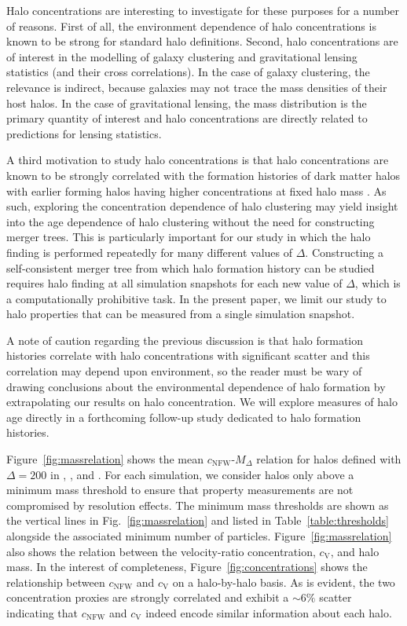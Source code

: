 \documentclass[usenatbib,fleqn]{mnras}
\begin{document}
Halo concentrations are interesting to investigate for these purposes for a number of reasons. First of all, the environment dependence of halo concentrations is known to be strong for standard halo definitions. Second, halo concentrations are of interest in the modelling of galaxy clustering and gravitational lensing statistics (and their cross correlations). In the case of galaxy clustering, the relevance is indirect, because galaxies may not trace the mass densities of their host halos. In the case of gravitational lensing, the mass distribution is the primary quantity of interest and halo concentrations are directly related to predictions for lensing statistics. 

A third motivation to study halo concentrations is that halo concentrations are known to be strongly correlated with the formation histories of dark matter halos with earlier forming halos having higher concentrations at fixed halo mass \citep{wechsler_etal02, zhao_etal03, wechsler_etal06, zhao_etal09}. 
As such, exploring the concentration dependence of halo clustering may yield insight into the age dependence of halo clustering without the need for constructing merger trees. This is particularly important for our study in which the halo finding is performed repeatedly for many different values of $\Delta$. Constructing a self-consistent merger tree from which halo formation history can be 
studied requires halo finding at all simulation snapshots for each new value of $\Delta$, which is a computationally prohibitive task. In the present paper, we limit our study to halo properties that can be measured from a single simulation 
snapshot. 

A note of caution regarding the previous discussion is that halo formation histories correlate with halo concentrations with significant scatter and this correlation may depend upon environment, so the reader must be wary of drawing conclusions about the environmental dependence of halo formation by extrapolating our results on halo concentration. We will explore measures of halo age directly in a forthcoming follow-up study dedicated to halo formation histories.

Figure~\ref{fig:massrelation} shows the mean $c_{\mathrm{NFW}}$-$M_{\Delta}$ relation for halos defined with $\Delta=200$ in \simA, \simB, and \simC. For each simulation, we consider halos only above a minimum mass threshold to ensure that property measurements are not compromised by resolution effects. The minimum mass thresholds are shown as the vertical lines in Fig.~\ref{fig:massrelation} and listed in Table~\ref{table:thresholds} alongside the associated minimum number of particles. Figure~\ref{fig:massrelation} also shows the relation between the velocity-ratio concentration, $c_{\mathrm{V}}$, and halo mass. In the interest of completeness, Figure~\ref{fig:concentrations} shows the relationship 
between $c_{\mathrm{NFW}}$ and $c_{\mathrm{V}}$ on a halo-by-halo basis. As is evident, the two concentration proxies are strongly correlated and exhibit a $\sim 6\%$ scatter indicating that $c_{\mathrm{NFW}}$ and $c_{\mathrm{V}}$ indeed encode similar information about each halo.
\end{document}
